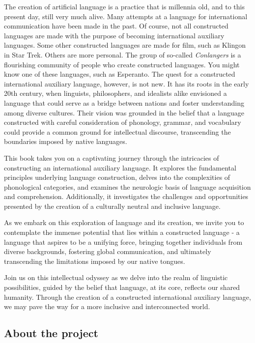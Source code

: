 The creation of artificial language is a practice that is millennia old, and to
this present day, still very much alive. Many attempts at a language for
international communication have been made in the past. Of course, not all
constructed languages are made with the purpose of becoming international
auxiliary languages. Some other constructed languages are made for film, such
as Klingon in Star Trek. Others are more personal. The group of so-called {\it Conlangers} is a flourishing
community of people who create constructed languages. You might know one of
these languages, such as Esperanto. The quest for a constructed international
auxiliary language, however, is not new. It has its roots in the early 20th
century, when linguists, philosophers, and idealists alike envisioned a
language that could serve as a bridge between nations and foster understanding
among diverse cultures. Their vision was grounded in the belief that a language
constructed with careful consideration of phonology, grammar, and vocabulary
could provide a common ground for intellectual discourse, transcending the
boundaries imposed by native languages.


This book takes you on a captivating journey through the intricacies of constructing an international auxiliary language. It explores the fundamental principles underlying language construction, delves into the complexities of phonological categories, and examines the neurologic basis of language acquisition and comprehension. Additionally, it investigates the challenges and opportunities presented by the creation of a culturally neutral and inclusive language. 

As we embark on this exploration of language and its creation, we invite you to contemplate the immense potential that lies within a constructed language - a language that aspires to be a unifying force, bringing together individuals from diverse backgrounds, fostering global communication, and ultimately transcending the limitations imposed by our native tongues. 

Join us on this intellectual odyssey as we delve into the realm of linguistic possibilities, guided by the belief that language, at its core, reflects our shared humanity. Through the creation of a constructed international auxiliary language, we may pave the way for a more inclusive and interconnected world. 

 

\subsection{About the project}

